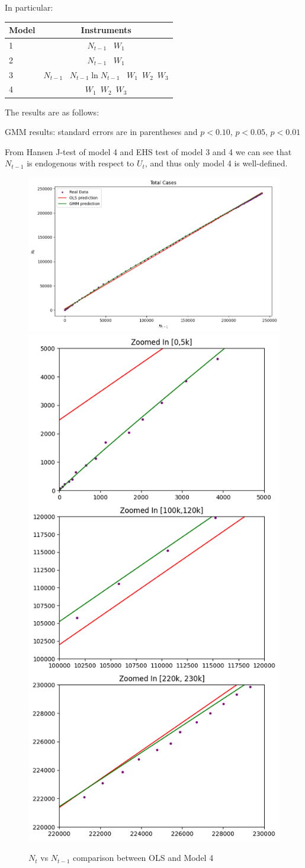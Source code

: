 \documentclass[12pt]{article}
\begin{document}
    In particular:
    \begin{table}[h!]
        \centering
        \begin{tabular}{l|c}
            Model & Instruments \\ \hline
            1 & $N_{t-1}$ \, $W_1$ \\
            2 & $N_{t-1}$ \, $W_1$ \\
            3 & $N_{t-1}$ \, $N_{t-1}  \ln N_{t-1}$ \, $W_1$\, $W_2$\, $W_3$ \\
            4 & $W_1$\, $W_2$\, $W_3$  \\
        \end{tabular}
    \end{table}

    The results are as follows:
    \begin{table}[h!]
        \centering
        
        \caption{GMM results: standard errors are in parentheses and \sym{*}\(p<0.10\), \sym{**}\(p<0.05\), \sym{***}\(p<0.01\)}
    \end{table}

    From Hansen J-test of model 4 and EHS test of model 3 and 4 we can see that $N_{t-1}$ is endogenous with respect to $U_t$, and thus only model 4 is well-defined.

    \begin{figure}[h!]
        \centering
        \includegraphics[width=0.6\linewidth]{plots/regression_comparison_1}\quad
        \includegraphics[width=0.2\linewidth]{plots/regression_comparison_2}
        \caption{$N_t$ vs $N_{t-1}$ comparison between OLS and Model 4}
        \label{fig:plot_gmm_ols_comp}
    \end{figure}
\end{document}
